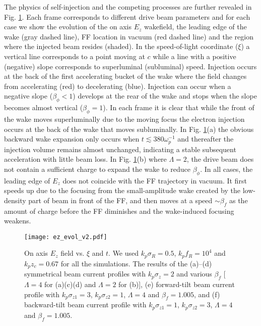 \documentclass[
aps,
prl,
reprint,
superscriptaddress,
amsmath,
amssymb,
showpacs
]{revtex4-2}
\begin{document}
The physics of self-injection and the competing processes are further revealed in Fig. \ref{fig:ez_evol}. Each frame corresponds to different drive beam parameters and for each case we show the evolution of the on axis $E_z$ wakefield, the leading edge of the wake (gray dashed line), FF location in vacuum (red dashed line) and the region where the injected beam resides (shaded). In the speed-of-light coordinate ($\xi$) a vertical line corresponds to a point moving at $c$ while a line with a positive (negative) slope corresponds to superluminal (subluminal) speed. Injection occurs at the back of the first accelerating bucket of the wake where the field changes from accelerating (red) to decelerating (blue). Injection can occur when a negative slope ($\beta_\phi<1$) develops at the rear of the wake and stops when the slope becomes almost vertical ($\beta_\phi=1$). In each frame it is clear that while the front of the wake moves superluminally due to the moving focus the electron injection occurs at the back of the wake that moves subluminally. In Fig. \ref{fig:ez_evol}(a) the obvious backward wake expansion only occurs when $t\lesssim380\omega_p^{-1}$ and thereafter the injection volume remains almost unchanged, indicating a stable subsequent acceleration with little beam loss. In Fig. \ref{fig:ez_evol}(b) where $\Lambda=2$, the drive beam does not contain a sufficient charge to expand the wake to reduce $\beta_\phi$. In all cases, the leading edge of $E_z$ does not coincide with the FF trajectory in vacuum. It first speeds up due to the focusing from the small-amplitude wake created by the low-density part of beam in front of the FF, and then moves at a speed $\sim\beta_f$ as the amount of charge before the FF diminishes and the wake-induced focusing weakens.

\begin{figure}[htbp]
\texttt{[image: ez\_evol\_v2.pdf]}
\caption{\label{fig:ez_evol}
On axis $E_z$ field vs. $\xi$ and $t$. We used $k_p \sigma_R=0.5$, $k_p f_R=10^4$ and $k_p z_c=0.67$ for all the simulations. The results of the (a)--(d) symmetrical beam current profiles with $k_p \sigma_z=2$ and various $\beta_f$ [$\Lambda=4$ for (a)(c)(d) and $\Lambda=2$ for (b)], (e) forward-tilt beam current profile with $k_p \sigma_{z1}=3$, $k_p \sigma_{z2}=1$, $\Lambda=4$ and $\beta_f=1.005$, and (f) backward-tilt beam current profile with $k_p \sigma_{z1}=1$, $k_p \sigma_{z2}=3$, $\Lambda=4$ and $\beta_f=1.005$.}
\end{figure}
\end{document}
